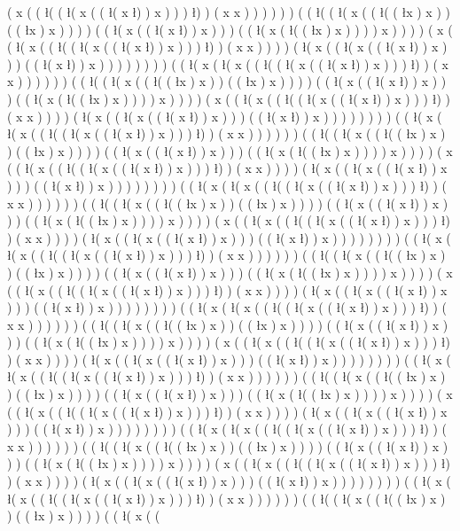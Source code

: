 ( x ( ( \l ( ( \l ( x ( ( \l ( x \l ) ) x ) ) ) \l ) ) ( x x ) ) ) ) ) ) ( ( \l ( ( \l ( x ( ( \l ( ( \l x ) x ) ) ( ( \l x ) x ) ) ) ) ( ( \l ( x ( ( \l ( x \l ) ) x ) ) ) ( ( \l ( x ( \l ( ( \l x ) x ) ) ) ) x ) ) ) ) ( x ( ( \l ( x ( ( \l ( ( \l ( x ( ( \l ( x \l ) ) x ) ) ) \l ) ) ( x x ) ) ) ) ( \l ( x ( ( \l ( x ( ( \l ( x \l ) ) x ) ) ) ( ( \l ( x \l ) ) x ) ) ) ) ) ) ) ) ( ( \l ( x ( \l ( x ( ( \l ( ( \l ( x ( ( \l ( x \l ) ) x ) ) ) \l ) ) ( x x ) ) ) ) ) ) ( ( \l ( ( \l ( x ( ( \l ( ( \l x ) x ) ) ( ( \l x ) x ) ) ) ) ( ( \l ( x ( ( \l ( x \l ) ) x ) ) ) ( ( \l ( x ( \l ( ( \l x ) x ) ) ) ) x ) ) ) ) ( x ( ( \l ( x ( ( \l ( ( \l ( x ( ( \l ( x \l ) ) x ) ) ) \l ) ) ( x x ) ) ) ) ( \l ( x ( ( \l ( x ( ( \l ( x \l ) ) x ) ) ) ( ( \l ( x \l ) ) x ) ) ) ) ) ) ) ) ( ( \l ( x ( \l ( x ( ( \l ( ( \l ( x ( ( \l ( x \l ) ) x ) ) ) \l ) ) ( x x ) ) ) ) ) ) ( ( \l ( ( \l ( x ( ( \l ( ( \l x ) x ) ) ( ( \l x ) x ) ) ) ) ( ( \l ( x ( ( \l ( x \l ) ) x ) ) ) ( ( \l ( x ( \l ( ( \l x ) x ) ) ) ) x ) ) ) ) ( x ( ( \l ( x ( ( \l ( ( \l ( x ( ( \l ( x \l ) ) x ) ) ) \l ) ) ( x x ) ) ) ) ( \l ( x ( ( \l ( x ( ( \l ( x \l ) ) x ) ) ) ( ( \l ( x \l ) ) x ) ) ) ) ) ) ) ) ( ( \l ( x ( \l ( x ( ( \l ( ( \l ( x ( ( \l ( x \l ) ) x ) ) ) \l ) ) ( x x ) ) ) ) ) ) ( ( \l ( ( \l ( x ( ( \l ( ( \l x ) x ) ) ( ( \l x ) x ) ) ) ) ( ( \l ( x ( ( \l ( x \l ) ) x ) ) ) ( ( \l ( x ( \l ( ( \l x ) x ) ) ) ) x ) ) ) ) ( x ( ( \l ( x ( ( \l ( ( \l ( x ( ( \l ( x \l ) ) x ) ) ) \l ) ) ( x x ) ) ) ) ( \l ( x ( ( \l ( x ( ( \l ( x \l ) ) x ) ) ) ( ( \l ( x \l ) ) x ) ) ) ) ) ) ) ) ( ( \l ( x ( \l ( x ( ( \l ( ( \l ( x ( ( \l ( x \l ) ) x ) ) ) \l ) ) ( x x ) ) ) ) ) ) ( ( \l ( ( \l ( x ( ( \l ( ( \l x ) x ) ) ( ( \l x ) x ) ) ) ) ( ( \l ( x ( ( \l ( x \l ) ) x ) ) ) ( ( \l ( x ( \l ( ( \l x ) x ) ) ) ) x ) ) ) ) ( x ( ( \l ( x ( ( \l ( ( \l ( x ( ( \l ( x \l ) ) x ) ) ) \l ) ) ( x x ) ) ) ) ( \l ( x ( ( \l ( x ( ( \l ( x \l ) ) x ) ) ) ( ( \l ( x \l ) ) x ) ) ) ) ) ) ) ) ( ( \l ( x ( \l ( x ( ( \l ( ( \l ( x ( ( \l ( x \l ) ) x ) ) ) \l ) ) ( x x ) ) ) ) ) ) ( ( \l ( ( \l ( x ( ( \l ( ( \l x ) x ) ) ( ( \l x ) x ) ) ) ) ( ( \l ( x ( ( \l ( x \l ) ) x ) ) ) ( ( \l ( x ( \l ( ( \l x ) x ) ) ) ) x ) ) ) ) ( x ( ( \l ( x ( ( \l ( ( \l ( x ( ( \l ( x \l ) ) x ) ) ) \l ) ) ( x x ) ) ) ) ( \l ( x ( ( \l ( x ( ( \l ( x \l ) ) x ) ) ) ( ( \l ( x \l ) ) x ) ) ) ) ) ) ) ) ( ( \l ( x ( \l ( x ( ( \l ( ( \l ( x ( ( \l ( x \l ) ) x ) ) ) \l ) ) ( x x ) ) ) ) ) ) ( ( \l ( ( \l ( x ( ( \l ( ( \l x ) x ) ) ( ( \l x ) x ) ) ) ) ( ( \l ( x ( ( \l ( x \l ) ) x ) ) ) ( ( \l ( x ( \l ( ( \l x ) x ) ) ) ) x ) ) ) ) ( x ( ( \l ( x ( ( \l ( ( \l ( x ( ( \l ( x \l ) ) x ) ) ) \l ) ) ( x x ) ) ) ) ( \l ( x ( ( \l ( x ( ( \l ( x \l ) ) x ) ) ) ( ( \l ( x \l ) ) x ) ) ) ) ) ) ) ) ( ( \l ( x ( \l ( x ( ( \l ( ( \l ( x ( ( \l ( x \l ) ) x ) ) ) \l ) ) ( x x ) ) ) ) ) ) ( ( \l ( ( \l ( x ( ( \l ( ( \l x ) x ) ) ( ( \l x ) x ) ) ) ) ( ( \l ( x ( ( \l ( x \l ) ) x ) ) ) ( ( \l ( x ( \l ( ( \l x ) x ) ) ) ) x ) ) ) ) ( x ( ( \l ( x ( ( \l ( ( \l ( x ( ( \l ( x \l ) ) x ) ) ) \l ) ) ( x x ) ) ) ) ( \l ( x ( ( \l ( x ( ( \l ( x \l ) ) x ) ) ) ( ( \l ( x \l ) ) x ) ) ) ) ) ) ) ) ( ( \l ( x ( \l ( x ( ( \l ( ( \l ( x ( ( \l ( x \l ) ) x ) ) ) \l ) ) ( x x ) ) ) ) ) ) ( ( \l ( ( \l ( x ( ( \l ( ( \l x ) x ) ) ( ( \l x ) x ) ) ) ) ( ( \l ( x ( ( 